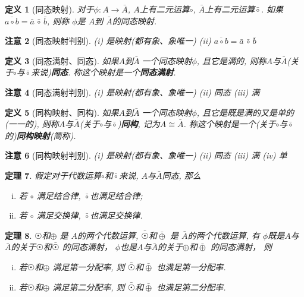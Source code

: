 \documentclass[UTF8]{ctexart}
\newtheorem{Definition}{定义}%
\newtheorem{Theorem}[Definition]{定理}
\newtheorem{Remark}[Definition]{注意}
\begin{document}
\begin{Definition}[同态映射]
对于$\phi: A \rightarrow \bar{A}$, $A$上有二元运算$\circ$, $\bar{A}$上有二元运算$\bar{\circ}$.
如果
$ \overline{a \circ b} = \bar{a} \, \bar{\circ} \, \bar{b}$, 则称 $\phi$是 $A$到 $\bar{A}$的同态映射.
\end{Definition}

\begin{Remark}[同态映射判别]
(i) 是映射(都有象、象唯一) (ii) $ \overline{a \circ b} = \bar{a} \,{\bar{\circ}}\, \bar{b}$
\end{Remark}

\begin{Definition}[同态满射、同态]
如果$A$到$\bar{A}\;${}\;一个同态映射$\phi$, 且它是满的, 则称$A$与$\bar{A}$\;(关于$\circ$与$\bar{\circ}$来说)\textbf{同态}. 称这个映射是一个\textbf{同态满射}.
\end{Definition}

\begin{Remark}[同态满射判别]
(i) 是映射(都有象、象唯一) (ii) 同态 (iii) 满
\end{Remark}


\begin{Definition}[同构映射、同构]
如果$A$到$\bar{A}\;${}\;一个同态映射$\phi$, 且它是既是满的又是单的(一一的), 则称$A$与$\bar{A}$(关于$\circ$与$\bar{\circ}$)\textbf{同构}, 记为$A \cong
 \bar{A}$. 称这个映射是一个(关于$\circ$与$\bar{\circ}$的)\textbf{同构映射}(简称).
\end{Definition}

\begin{Remark}[同构映射判别]
(i) 是映射(都有象、象唯一) (ii) 同态 (iii) 满 (iv) 单
\end{Remark}

\begin{Theorem}
假定对于代数运算$\circ$和$\bar{\circ}$来说, $A$与$\bar{A}$同态, 那么
\begin{enumerate}[i)]
\item 若 $\circ$ 满足结合律, $\bar{\circ}$也满足结合律;
\item 若 $\circ$ 满足交换律, $\bar{\circ}$也满足交换律.
\end{enumerate}
\end{Theorem}

\begin{Theorem}
$ \astrosun $和$ \oplus $ 是 $A$的两个代数运算, 
$ \bar{\astrosun} $和$\bar{\oplus} $ 是 $\bar{A}$的两个代数运算,
有
$\phi$既是$A$与$\bar{A}$的关于$ \astrosun $和$\bar{\astrosun}$ 的同态满射，
$\phi$也是$A$与$\bar{A}$的关于$ \oplus $和$\bar{\oplus}$ 的同态满射，
则 
\begin{enumerate}[i)]
\item 若$ \astrosun$和$ \oplus $  满足第一分配率, 则 $ \bar{\astrosun} $和$\bar{\oplus} $ 也满足第一分配率.
\item 若$ \astrosun$和$\oplus $  满足第二分配率, 则 $ \bar{\astrosun} $和$\bar{\oplus} $ 也满足第二分配率.
\end{enumerate}
\end{Theorem}
\end{document}
